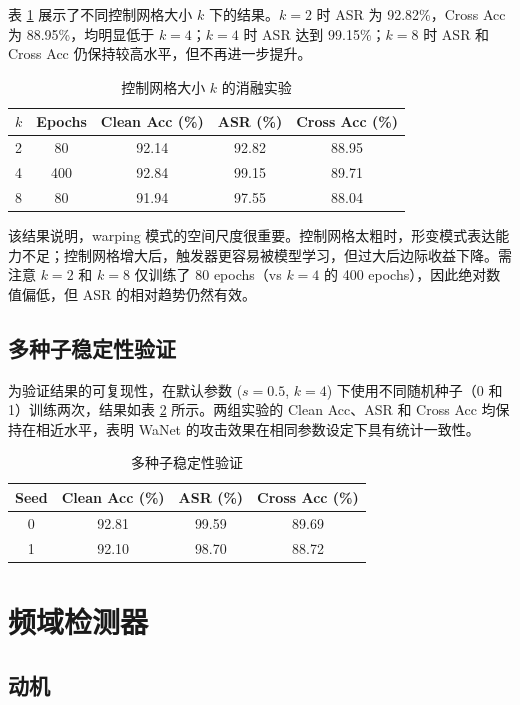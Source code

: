 \documentclass[UTF8,zihao=-4]{ctexart}
\begin{document}
表 \ref{tab:k} 展示了不同控制网格大小 $k$ 下的结果。$k=2$ 时 ASR 为 92.82\%，Cross Acc 为 88.95\%，均明显低于 $k=4$；$k=4$ 时 ASR 达到 99.15\%；$k=8$ 时 ASR 和 Cross Acc 仍保持较高水平，但不再进一步提升。

\begin{table}[H]
\centering
\caption{控制网格大小 $k$ 的消融实验}
\label{tab:k}
\begin{tabular}{lcccc}
\toprule
$k$ & Epochs & Clean Acc (\%) & ASR (\%) & Cross Acc (\%) \\
\midrule
2 & 80 & 92.14 & 92.82 & 88.95 \\
4 & 400 & 92.84 & 99.15 & 89.71 \\
8 & 80 & 91.94 & 97.55 & 88.04 \\
\bottomrule
\end{tabular}
\end{table}

该结果说明，warping 模式的空间尺度很重要。控制网格太粗时，形变模式表达能力不足；控制网格增大后，触发器更容易被模型学习，但过大后边际收益下降。需注意 $k=2$ 和 $k=8$ 仅训练了 80 epochs（vs $k=4$ 的 400 epochs），因此绝对数值偏低，但 ASR 的相对趋势仍然有效。

\subsection{多种子稳定性验证}

为验证结果的可复现性，在默认参数 ($s=0.5$, $k=4$) 下使用不同随机种子（0 和 1）训练两次，结果如表 \ref{tab:seed} 所示。两组实验的 Clean Acc、ASR 和 Cross Acc 均保持在相近水平，表明 WaNet 的攻击效果在相同参数设定下具有统计一致性。

\begin{table}[H]
\centering
\caption{多种子稳定性验证}
\label{tab:seed}
\begin{tabular}{cccc}
\toprule
Seed & Clean Acc (\%) & ASR (\%) & Cross Acc (\%) \\
\midrule
0 & 92.81 & 99.59 & 89.69 \\
1 & 92.10 & 98.70 & 88.72 \\
\bottomrule
\end{tabular}
\end{table}

\section{频域检测器}

\subsection{动机}
\end{document}
